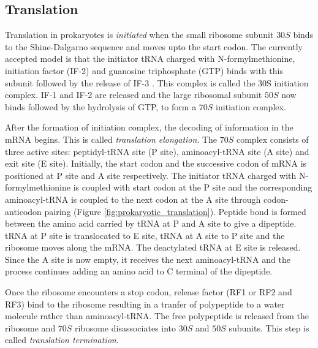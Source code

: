 \subsection{Translation}

Translation in prokaryotes is \textit{initiated} when the small ribosome subunit $30S$ binds to the Shine-Dalgarno sequence and moves upto the start codon. The currently accepted model is that the initiator tRNA charged with N-formylmethionine, initiation factor (IF-2) and guanosine triphosphate (GTP) binds with this subunit followed by the release of IF-3 \cite{hames2005biochemistry}. This complex is called the 30S initiation complex. IF-1 and IF-2 are released and the large ribosomal subunit $50S$ now binds followed by the hydrolysis of GTP, to form a $70S$ initiation complex. 

After the formation of initiation complex, the decoding of information in the mRNA begins. This is called \textit{translation elongation}. The $70S$ complex consists of three active sites: peptidyl-tRNA site (P site), aminoacyl-tRNA site (A site) and exit site (E site). Initially, the start codon and the successive codon of mRNA is positioned at P site and A site respectively. The initiator tRNA charged with N-formylmethionine is coupled with start codon at the P site and the corresponding aminoacyl-tRNA is coupled to the next codon at the A site through codon-anticodon pairing (Figure \ref{fig:prokaryotic_translation}). Peptide bond is formed between the amino acid carried by tRNA at P and A site to give a dipeptide. tRNA at P site is translocated to E site, tRNA at A site to P site and the ribosome moves along the mRNA. The deactylated tRNA at E site is released. Since the A site is now empty, it receives the next aminoacyl-tRNA and the process continues adding an amino acid to C terminal of the dipeptide. 


Once the ribosome encounters a stop codon, release factor (RF1 or RF2 and RF3) bind to the ribosome resulting in a tranfer of polypeptide to a water molecule rather than aminoacyl-tRNA. The free polypeptide is released from the ribosome and $70S$ ribosome disassociates into $30S$ and $50S$ subunits. This step is called \textit{translation termination}. 




